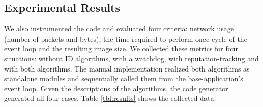 \documentclass[3p,times,procedia]{elsarticle}
\begin{document}
\vspace{-1mm}
\subsection{Experimental Results}

We also instrumented the code and evaluated four criteria: network usage
(number of packets and bytes), the time required to perform once cycle of the
event loop and the resulting image size. We collected these metrics for four
situations: without ID algorithms, with a watchdog, with reputation-tracking
and with both algorithms. The manual implementation realized both algorithms as
standalone modules and sequentially called them from the base-application's
event loop. Given the \FOO descriptions of the algorithms, the code generator
generated all four cases. Table \ref{tbl:results} shows the collected data.
\end{document}
